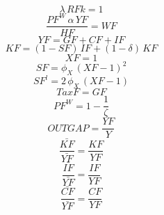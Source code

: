 \begin{dmath}
{\lambda}\, {RFk}=1
\end{dmath}
\begin{dmath}
\frac{{PF^{W}}\, {{\alpha}}\, {YF}}{{HF}}={WF}
\end{dmath}
\begin{dmath}
{YF}={GF}+{CF}+{IF}
\end{dmath}
\begin{dmath}
{KF}=\left(1-{SF}\right)\, {IF}+\left(1-{{\delta}}\right)\, {KF}
\end{dmath}
\begin{dmath}
{XF}=1
\end{dmath}
\begin{dmath}
{SF}={{\phi_{X}}}\, \left({XF}-1\right)^{2}
\end{dmath}
\begin{dmath}
{SF^{l}}=2\, {{\phi_{X}}}\, \left({XF}-1\right)
\end{dmath}
\begin{dmath}
{TaxF}={GF}
\end{dmath}
\begin{dmath}
{PF^{W}}=1-\frac{1}{{{\zeta}}}
\end{dmath}
\begin{dmath}
{OUTGAP}=\frac{{YF}}{{Y}}
\end{dmath}
\begin{dmath}
{\frac{\bar{KF}}{\bar{YF}}}=\frac{{KF}}{{YF}}
\end{dmath}
\begin{dmath}
{\frac{\bar{IF}}{\bar{YF}}}=\frac{{IF}}{{YF}}
\end{dmath}
\begin{dmath}
{\frac{\bar{CF}}{\bar{YF}}}=\frac{{CF}}{{YF}}
\end{dmath}
